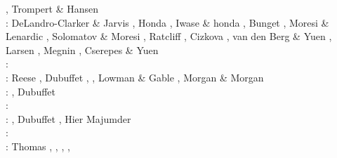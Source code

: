 \begin{scriptsize}
                    \cite{rasz96}\cite{rasz96b}
                    \cite{leka96}\cite{iwas96}
                    \cite{buri96}\cite{schh96}, Trompert \& Hansen \cite{trha96}\\
\nineteenninetyseven: DeLandro-Clarker \& Jarvis \cite{deja97}, Honda \cite{hond97}, 
                      Iwase \& honda \cite{iwho97}, Bunget \etal \cite{burb97},
                      Moresi \& Lenardic \cite{mole97}, Solomatov \& Moresi \cite{somo97},
                      Ratcliff \etal \cite{rats97}, Cizkova \etal \cite{cicv97},
                      van den Berg \& Yuen \cite{vayu97}, Larsen \etal \cite{laym97},
                      Megnin \etal \cite{mebr97}, Cserepes \& Yuen \cite{csyu97}\\
\nineteenninetyeight: \cite{ande98}\cite{iwho98}\cite{devv98}\cite{tack98}\cite{tack98b}\cite{trha98b}
      \cite{trha98}\cite{burl98}\cite{mokm98}\cite{lena98}\cite{vayu98}\cite{wema98}\\
\nineteenninetynine: Reese \etal \cite{resb99}, Dubuffet \etal \cite{duyr99}, 
                     \cite{vazh99}\cite{dava99}
                     \cite{tabg99}\cite{como99}
                     \cite{cicv99}\cite{trrj99},
                     Lowman \& Gable \cite{loga99}, Morgan \& Morgan \cite{momo99}\\ 
\twothousand: \cite{albe00}\cite{hayu00}
              \cite{devv00b}\cite{tack00}
              \cite{tack00b}\cite{tack00c}
              \cite{tack00d}\cite{zhzm00}
              \cite{legm00}\cite{conr00}
              \cite{somo00},  Dubuffet \etal \cite{duyu00,duyy00}\\
\twothousandone: \cite{vank01}\cite{riyb01}
                 \cite{lemo01}\cite{vays01}
                 \cite{moqu01}\cite{zhon01}
                 \cite{burm01}\cite{dabu01}\\
\twothousandtwo: \cite{tasu02}\cite{modm02}
                 \cite{tack02}\cite{vaya02}
                 \cite{vayu02}\cite{taxi02}
                 \cite{scbh02}\cite{strb02}, 
                 Dubuffet \etal \cite{duyr02}, Hier Majumder \etal{} \cite{hiys02}\\
\twothousandthree: \cite{hapa03}\cite{lemo03}
                   \cite{mumc03}\cite{fasa03}
                   \cite{heta03}\cite{sibu03}
                   \cite{ogaw03,ogaw03b}\\
\twothousandfour: Thomas \etal \cite{thkl04}, \cite{vavv04b}
                  \cite{xita04b}\cite{xita04},
                  \cite{nata04b}\cite{vayr04},
                  \cite{brws04}\cite{stsh04},

\end{scriptsize}
